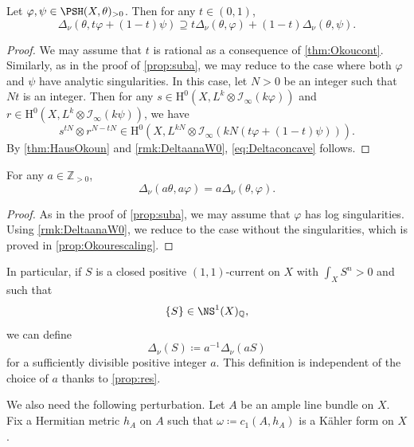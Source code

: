 \begin{theorem}\label{thm:concOko}
	Let $\varphi,\psi\in \PSH(X,\theta)_{>0}$. Then for any $t\in (0,1)$,
	\begin{equation}\label{eq:Deltaconcave}
		\Delta_{\nu}\left(\theta,t\varphi+(1-t)\psi\right)\supseteq t\Delta_{\nu}(\theta,\varphi)+(1-t)\Delta_{\nu}(\theta,\psi).
	\end{equation}
\end{theorem}
\begin{proof}
		We may assume that $t$ is rational as a consequence of \cref{thm:Okoucont}. Similarly, as in the proof of \cref{prop:suba},
		we may reduce to the case where both $\varphi$ and $\psi$ have analytic singularities.
	In this case, let $N>0$ be an integer such that $Nt$ is an integer.
    Then for any $s\in \mathrm{H}^0(X,L^k\otimes \mathcal{I}_{\infty}(k\varphi))$ and $r\in \mathrm{H}^0(X,L^k\otimes \mathcal{I}_{\infty}(k\psi))$, we have
    \[
    s^{tN}\otimes r^{N-tN}\in \mathrm{H}^0\left(X,L^{kN}\otimes \mathcal{I}_{\infty}\left(kN(t\varphi+(1-t)\psi)\right)\right).
    \]
	By \cref{thm:HausOkoun} and \cref{rmk:DeltaanaW0}, \eqref{eq:Deltaconcave} follows.
\end{proof}

\begin{proposition}\label{prop:res}
	For any $a\in \mathbb{Z}_{>0}$,
	\[
		\Delta_{\nu}(a\theta,a\varphi)=a\Delta_{\nu}(\theta,\varphi).
	\]
\end{proposition}
\begin{proof}
As in the proof of \cref{prop:suba}, we may assume that $\varphi$ has log singularities. Using \cref{rmk:DeltaanaW0}, we reduce to the case without the singularities, which is proved in
\cref{prop:Okourescaling}.
\end{proof}

In particular, if $S$ is a closed positive $(1,1)$-current on $X$ with $\int_X S^n>0$ and such that
\[
\{S\}\in \NS^1(X)_{\mathbb{Q}},
\]
we can define
\begin{equation}\label{eq:DeltanuTalgebraic1}
\Delta_{\nu}(S)\coloneqq a^{-1}\Delta_{\nu}(aS)
\end{equation}
for a sufficiently divisible positive integer $a$. This definition is independent of the choice of $a$ thanks to \cref{prop:res}.

We also need the following perturbation. Let $A$ be an ample line bundle on $X$. Fix a Hermitian metric $h_A$ on $A$ such that $\omega\coloneqq c_1(A,h_A)$ is a Kähler form on $X$.

